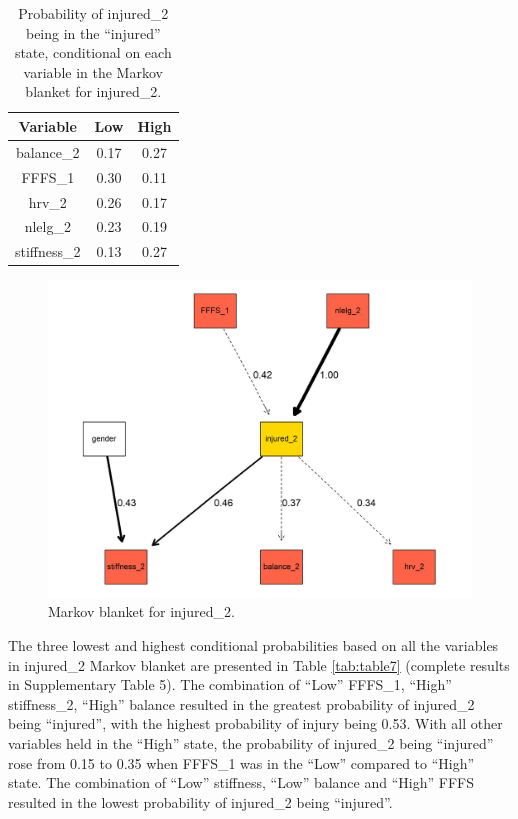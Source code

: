 \documentclass[
  english,
  man]{apa6}
\begin{document}
\begin{table}[H]

\caption{\label{tab:table6}Probability of injured\_2 being in the ``injured'' state, conditional on each variable in the Markov blanket for injured\_2.}
\centering
\begin{tabular}[t]{c|c|c}
\hline
\textbf{Variable} & \textbf{Low} & \textbf{High}\\
\hline
balance\_2 & 0.17 & 0.27\\
\hline
FFFS\_1 & 0.30 & 0.11\\
\hline
hrv\_2 & 0.26 & 0.17\\
\hline
nlelg\_2 & 0.23 & 0.19\\
\hline
stiffness\_2 & 0.13 & 0.27\\
\hline
\end{tabular}
\end{table}

\begin{figure}

{\centering \includegraphics[width=1\linewidth]{figures_doc/Fig3} 

}

\caption{Markov blanket for injured\_2.}\label{fig:fig3}
\end{figure}

The three lowest and highest conditional probabilities based on all the variables in injured\_2 Markov blanket are presented in Table \ref{tab:table7} (complete results in Supplementary Table 5).
The combination of ``Low'' FFFS\_1, ``High'' stiffness\_2, ``High'' balance resulted in the greatest probability of injured\_2 being ``injured'', with the highest probability of injury being 0.53.
With all other variables held in the ``High'' state, the probability of injured\_2 being ``injured'' rose from 0.15 to 0.35 when FFFS\_1 was in the ``Low'' compared to ``High'' state.
The combination of ``Low'' stiffness, ``Low'' balance and ``High'' FFFS resulted in the lowest probability of injured\_2 being ``injured''.
\end{document}
